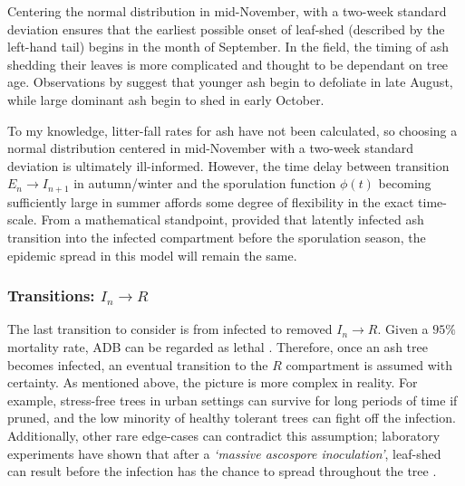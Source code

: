 Centering the normal distribution in mid-November, with a two-week standard deviation ensures that the earliest possible onset of leaf-shed (described by the left-hand tail) begins in the month of September.
In the field, the timing of ash shedding their leaves is more complicated and thought to be dependant on tree age. 
Observations by \cite{hietala2013invasive} suggest that younger ash begin to defoliate in late August, while large dominant ash begin to shed in early October.

To my knowledge, litter-fall rates for ash have not been calculated,
so choosing a normal distribution centered in mid-November with a two-week standard deviation is ultimately ill-informed. 
However, the time delay between transition $E_n \rightarrow I_{n+1}$ in autumn/winter and the sporulation function $\phi(t)$ becoming sufficiently large in summer affords some degree of flexibility in the exact time-scale.
From a mathematical standpoint, provided that latently infected ash transition into the infected compartment before the sporulation season, 
the epidemic spread in this model will remain the same.


\subsubsection{Transitions: $I_n\rightarrow R$}

The last transition to consider is from infected to removed $I_{n}\rightarrow R$. Given a $95\%$ mortality rate, ADB can be regarded as lethal \cite{ash-dieback-costs}.
Therefore, once an ash tree becomes infected, an eventual transition to the $R$ compartment is assumed with certainty.
As mentioned above, the picture is more complex in reality. 
For example, stress-free trees in urban settings can survive for long periods of time if pruned, and the low minority of healthy tolerant trees can fight off the infection.
Additionally, other rare edge-cases can contradict this assumption;
laboratory experiments have shown that after a \textit{`massive ascospore inoculation'}, leaf-shed can result before the infection has the chance to spread throughout the tree \cite{https://doi.org/10.1111/mpp.12073}.

